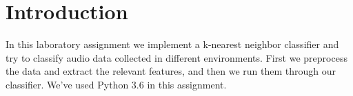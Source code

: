 \section{Introduction}
In this laboratory assignment we implement a k-nearest neighbor classifier and
try to classify audio data collected in different environments. First we
preprocess the data and extract the relevant features, and then we run them
through our classifier. We've used Python 3.6 in this assignment.

